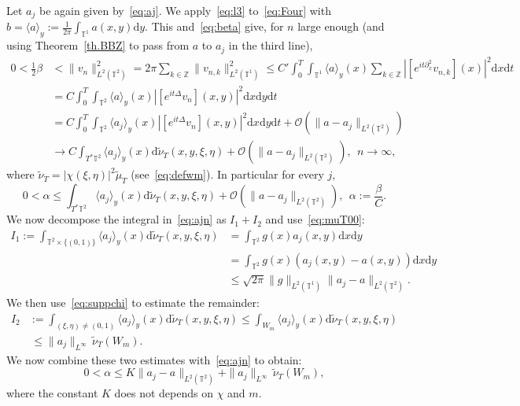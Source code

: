 \documentclass[AHL, Unicode, longabstracts]{cedram}
\newcommand{\TT}{{\mathbb T}}
\newcommand{\ZZ}{{\mathbb Z}}
\newcommand{\TT}{{\mathbb T}}
\newcommand{\ZZ}{{\mathbb Z}}
\newcommand*{\dd}{\mathrm{d}}
\newcommand*{\dx}{\dd x}
\newcommand*{\dy}{\dd y}
\newcommand*{\dt}{\dd t}
\newcommand*{\dwnu}{\dd \widetilde\nu}
\begin{document}
Let $ a_j $ be again given by~\eqref{eq:aj}. We apply~\eqref{eq:l3} to~\eqref{eq:Four} with $ b = \langle a \rangle_y := \frac{1}{ 2 \pi} \int_{ \TT^1} a (x, y) \dy $. This and~\eqref{eq:beta} give, for $ n $ large enough (and using Theorem~\ref{th.BBZ} to pass from $ a$ to $ a_j $ in the third line),
\begin{align*}
0 < \tfrac12 \beta & < \| v_n \|_{L^2 (\TT^2) }^2 = 2 \pi \sum_{k \in \ZZ } \| v_{n,k} \|_{ L^2 (\TT^1) }^2
\leq C' \int_0^T \int_{\TT^1} \langle a \rangle_y (x) \sum_{ k \in \ZZ} | [e^{ it \partial_x^2 } v_{n,k}] (x) |^2 \dx \dt
\\
& = C \int_0^T \int_{ \TT^2 } \langle a \rangle_y (x) |[e^{ it \Delta } v_n] (x, y) |^2 \dx \dy \dt \\
& = C \int_0^T \int_{\TT^2} \langle a_j \rangle_y (x) | [e^{ it \Delta } v_n] (x, y) |^2 \dx \dy \dt +
\mathcal O (\| a - a_j \|_{L^2 (
\TT^2) }) \\
& \longrightarrow C \int_{T^* \TT^2 }
\langle a_j \rangle_y (x) \dwnu_T (x, y, \xi, \eta) + \mathcal O (\| a - a_j \|_{L^2 (
\TT^2) }), \ \ n \longrightarrow \infty,
\end{align*}
where $ \widetilde \nu_T = |\chi (\xi, \eta)|^2 \widetilde \mu_T $ (see~\eqref{eq:defwm}). In particular for every $ j $,
\begin{equation}\label{eq:ajn}
0 < \alpha \leq \int_{T^* \TT^2 }
\langle a_j \rangle_y (x) \dwnu_T (x, y, \xi, \eta) + \mathcal O (\| a - a_j \|_{L^2 (
\TT^2) }), \ \
\alpha := \frac{ \beta}{ C }.
\end{equation}
We now decompose the integral in~\eqref{eq:ajn} as $ I_1 + I_2 $ and use~\eqref{eq:muT00}:
\begin{equation}\label{eq:aj1}
\begin{split}
I_1 := \int_{ \TT^2 \times \{ (0, 1) \} } \langle a_j \rangle_y (x) \dwnu_T (x, y, \xi, \eta) & =
\int_{ \TT^2 } g (x) a_j (x, y) \dx \dy \\
& =
\int_{ \TT^2 } g (x) (a_j (x, y) - a (x, y)) \dx \dy \\
& \leq {\sqrt{ 2 \pi }} \| g \|_{ L^2 (\TT^1) } \| a_j - a \|_{L^2 (\TT^2) }.
\end{split}
\end{equation}
We then use~\eqref{eq:suppchi} to estimate the remainder:
\[
\begin{split}
I_2 & := \int_{ (\xi, \eta) \neq (0, 1) }
\langle a_j \rangle_y (x) \dwnu_T (x, y, \xi, \eta)
\leq \int_{W_m } \langle a_j \rangle_y (x) \dwnu_T (x, y, \xi, \eta) \\
&\, \leq \| a_j \|_{ L^\infty } \, \widetilde \nu_T (W_m).
\end{split}
\]
We now combine these two estimates with~\eqref{eq:ajn} to obtain:
\[
0 < \alpha \leq K \| a_j - a \|_{L^2 (\TT^2) } + \| a_j \|_{ L^\infty } \, \widetilde \nu_T (W_m),
\]
where the constant $ K $ does not depends on $ \chi $ and $ m $.
\end{document}
